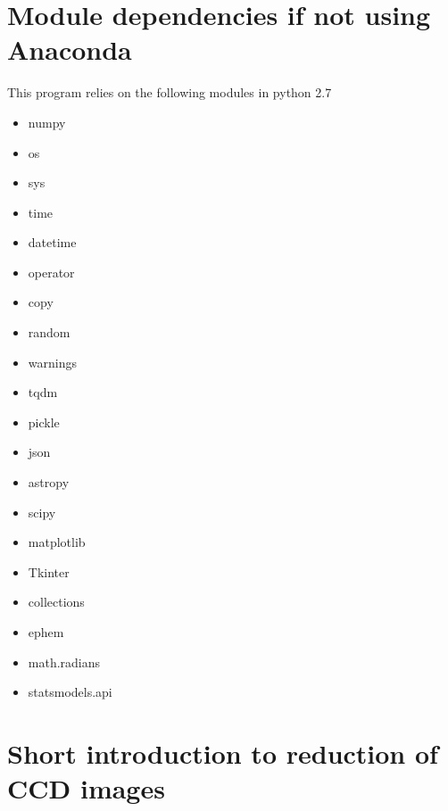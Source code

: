\documentclass[10pt,a4paper]{article}
\begin{document}
\newpage

\appendix

\section{Module dependencies if not using Anaconda}
\label{section:module_dependency}
\noindent This program relies on the following modules in python 2.7

\begin{itemize}\setlength\itemsep{0em}
\item numpy
\item os
\item sys
\item time
\item datetime
\item operator
\item copy
\item random
\item warnings
\item tqdm
\item pickle
\item json
\item astropy
\item scipy
\item matplotlib
\item Tkinter
\item collections
\item ephem
\item math.radians
\item statsmodels.api
\end{itemize}



\newpage
\appendix
\section{Short introduction to reduction of CCD images}
\end{document}
